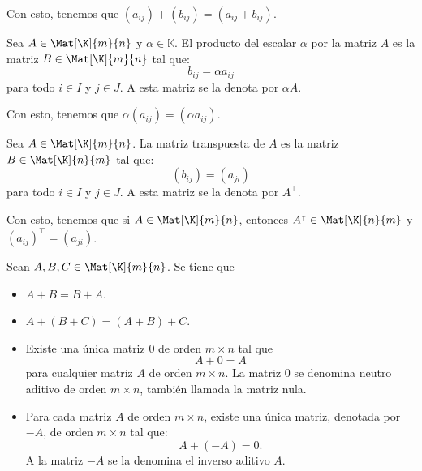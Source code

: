 \documentclass[a4,11pt]{aleph-notas}
\begin{document}
\begin{advertencia}
    Con esto, tenemos que $(a_{ij})+(b_{ij})=(a_{ij} + b_{ij})$.
\end{advertencia}

\begin{defi}
    Sea $A\in \Mat[\K]{m}{n}$ y $\alpha \in \mathbb{K}$. El producto del escalar $\alpha$ por la matriz $A$ es la matriz $B\in \Mat[\K]{m}{n}$ tal que:
    \[ 
        b_{ij} = \alpha a_{ij}
    \]
    para todo $i \in I$ y $j \in J$. A esta matriz se la denota por $\alpha A$.
\end{defi}

\begin{advertencia}
    Con esto, tenemos que $\alpha (a_{ij}) =(\alpha a_{ij})$.
\end{advertencia}

\begin{defi}
    Sea $A \in \Mat[\K]{m}{n}$. La matriz transpuesta de $A$ es la matriz $B\in \Mat[\K]{n}{m}$ tal que: 
    \[
        (b_{ij}) = (a_{ji})
    \]
    para todo $i\in I$ y $j \in J$. A esta matriz se la denota por $A^\intercal$.
\end{defi}

\begin{advertencia}
    Con esto, tenemos que si $A\in \Mat[\K]{m}{n}$, entonces $A^\intercal\in \Mat[\K]{n}{m}$ y $(a_{ij})^\intercal =(a_{ji})$.
\end{advertencia}

\begin{teo}
    Sean $A,B,C\in\Mat[\K]{m}{n}$. Se tiene que
    \begin{itemize}
    \item 
        $A + B = B + A$.
    \item 
        $A + (B+C) = (A + B)+C$.
    \item 
        Existe una única matriz $0$ de orden $m \times n$ tal que 
        \[ 
            A + 0 =  A 
        \]
        para cualquier matriz $A$ de orden $m \times n$. La matriz $0$ se denomina neutro aditivo de orden $m \times n$, también llamada la matriz nula.
    \item 
        Para cada matriz $A$ de orden $m \times n$, existe una única matriz, denotada por $-A$, de orden $m \times n$ tal que:
        \[
            A + (-A) = 0.
        \]
        A la matriz $-A$ se la denomina el inverso aditivo $A$.
    \end{itemize}
\end{teo}
\end{document}
